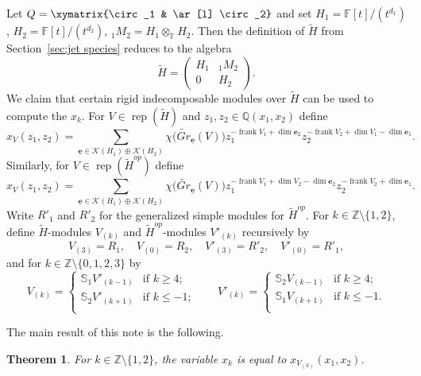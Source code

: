 \documentclass{amsart}
\numberwithin{equation}{section}
\newtheorem{theorem}{Theorem}[section]
\theoremstyle{definition}
\def\FF{\mathbb{F}}
\def\QQ{\mathbb{Q}}
\def\SS{\mathbb{S}}
\def\ZZ{\mathbb{Z}}
\def\bfe{\mathbf{e}}
\def\ubfe{{\underline{\mathbf{e}}}}
\def\cK{\mathcal{K}}
\def\dim{\operatorname{dim}}
\def\frank{\operatorname{frank}}
\def\rep{\operatorname{rep}}
\begin{document}
Let $Q=\xymatrix{\circ_1 & \ar[l] \circ_2}$ and set $H_1=\FF[t]/(t^{d_1})$, $H_2=\FF[t]/(t^{d_2})$, ${}_1M_2=H_1\otimes_\FF H_2$.  Then the definition of $\tilde H$ from Section~\ref{sec:jet species} reduces to the algebra 
\[\tilde H=\left(\begin{array}{cc}H_1 & {}_1M_2\\ 0 & H_2\end{array}\right).\]  We claim that certain rigid indecomposable modules over $\tilde H$ can be used to compute the $x_k$. For $V\in\rep(\tilde H)$ and $z_1,z_2\in\QQ(x_1,x_2)$ define
\begin{equation}\label{eq:cluster character}
  x_V(z_1,z_2)=\sum_{\ubfe\in\cK(H_1)\oplus\cK(H_2)}\chi\big(\widetilde{Gr}_{\ubfe}(V)\big)z_1^{-\frank V_1+\dim\bfe_2}z_2^{-\frank V_2+\dim V_1-\dim\bfe_1}.
\end{equation}
Similarly, for $V\in\rep(\tilde H^{op})$ define
\begin{equation}\label{eq:cluster character op}
  x_V(z_1,z_2)=\sum_{\ubfe\in\cK(H_1)\oplus\cK(H_2)}\chi\big(\widetilde{Gr}_{\ubfe}(V)\big)z_1^{-\frank V_1+\dim V_2-\dim\bfe_2}z_2^{-\frank V_2+\dim\bfe_1}.
\end{equation}
Write $R'_1$ and $R'_2$ for the generalized simple modules for $\tilde H^{op}$.  For $k\in\ZZ\setminus\{1,2\}$, define $\tilde H$-modules $V_{(k)}$ and $\tilde H^{op}$-modules $V'_{(k)}$ recursively by 
\[V_{(3)}=R_1,\quad V_{(0)}=R_2,\quad V'_{(3)}=R'_2,\quad V'_{(0)}=R'_1,\]
and for $k\in\ZZ\setminus\{0,1,2,3\}$ by
\begin{equation}\label{eq:preprojectives and postinjectives}
  V_{(k)}=\begin{cases}\SS_1 V'_{(k-1)} & \text{if $k\ge4$;}\\\SS_2 V'_{(k+1)} & \text{if $k\le -1$;}\\\end{cases}
  \qquad
  V'_{(k)}=\begin{cases}\SS_2 V_{(k-1)} & \text{if $k\ge4$;}\\\SS_1 V_{(k+1)} & \text{if $k\le -1$.}\\\end{cases}
\end{equation}

The main result of this note is the following.
\begin{theorem}\label{th:categorification}
  For $k\in\ZZ\setminus\{1,2\}$, the variable $x_k$ is equal to $x_{V_{(k)}}(x_1,x_2)$.
\end{theorem}
\end{document}
